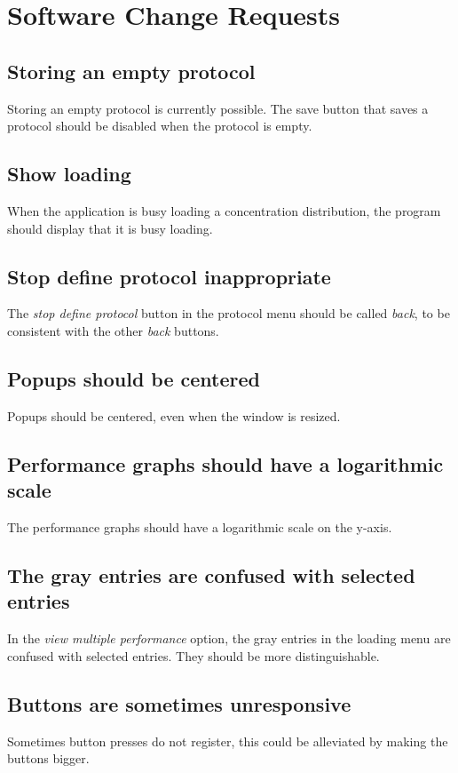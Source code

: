 \chapter{Software Change Requests}
\label{chap:changes}

\section*{Storing an empty protocol}
Storing an empty protocol is currently possible. The save button that saves a protocol should be disabled when the protocol is empty.

\section*{Show loading}
When the application is busy loading a concentration distribution, the program should display that it is busy loading.

\section*{Stop define protocol inappropriate}
The \emph{stop define protocol} button in the protocol menu should be called \emph{back}, to be consistent with the other \emph{back} buttons.

\section*{Popups should be centered}
Popups should be centered, even when the window is resized.

\section*{Performance graphs should have a logarithmic scale}
The performance graphs should have a logarithmic scale on the y-axis.

\section*{The gray entries are confused with selected entries}
In the \emph{view multiple performance} option, the gray entries in the loading menu are confused with selected entries. They should be more distinguishable.

\section*{Buttons are sometimes unresponsive}
Sometimes button presses do not register, this could be alleviated by making the buttons bigger.

